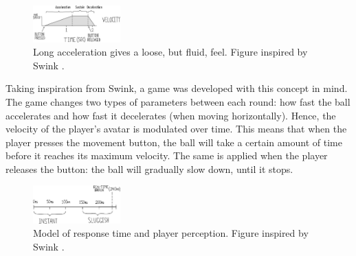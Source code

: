 \begin{figure}[htbp]
\centering
\includegraphics[width=0.30\textwidth]{Pics/adsr_loose}
\caption{Long acceleration gives a loose, but fluid, feel. Figure inspired by Swink \cite{swink}.}
\label{fig:adsr_loose}
\end{figure}

Taking inspiration from Swink, a game was developed with this concept in mind. The game changes two types of parameters between each round: how fast the ball accelerates and how fast it decelerates (when moving horizontally). Hence, the velocity of the player's avatar is modulated over time. This means that when the player presses the movement button, the ball will take a certain amount of time before it reaches its maximum velocity. The same is applied when the player releases the button: the ball will gradually slow down, until it stops.


\begin{figure}[htbp]
\centering
\includegraphics[width=0.30\textwidth]{Pics/response}
\caption{Model of response time and player perception. Figure inspired by Swink \cite{swink}.}
\label{fig:response}
\end{figure}

